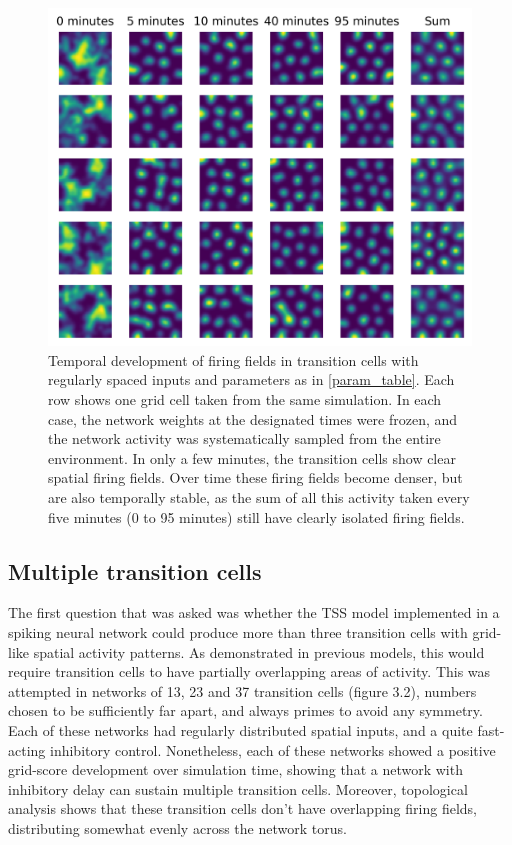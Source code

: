\documentclass{article}
\begin{document}
    \begin{figure}[H]
        \centering
        \begin{minipage}[b]{12cm}
        \includegraphics[width=\linewidth]{spike_temp_plot.png}
        \caption{Temporal development of firing fields in transition cells with regularly spaced inputs and parameters as in \ref{param_table}. Each row shows one grid cell taken from the same simulation. In each case, the network weights at the designated times were frozen, and the network activity was systematically sampled from the entire environment. In only a few minutes, the transition cells show clear spatial firing fields. Over time these firing fields become denser, but are also temporally stable, as the sum of all this activity taken every five minutes (0 to 95 minutes) still have clearly isolated firing fields.}
        \label{spike_temp_plot}
        \end{minipage}
    \end{figure}

    \subsection{Multiple transition cells}
    The first question that was asked was whether the TSS model implemented in a spiking neural network could produce more than three transition cells with grid-like spatial activity patterns. As demonstrated in previous models, this would require transition cells to have partially overlapping areas of activity. This was attempted in networks of 13, 23 and 37 transition cells (figure 3.2), numbers chosen to be sufficiently far apart, and always primes to avoid any symmetry. Each of these networks had regularly distributed spatial inputs, and a quite fast-acting inhibitory control. Nonetheless, each of these networks showed a positive grid-score development over simulation time, showing that a network with inhibitory delay can sustain multiple transition cells. Moreover, topological analysis shows that these transition cells don’t have overlapping firing fields, distributing somewhat evenly across the network torus.
\end{document}
